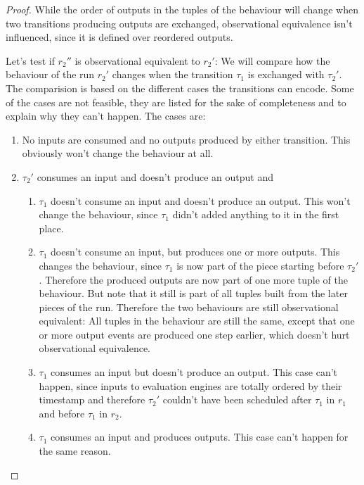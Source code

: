 \begin{proof}
    While the order of outputs in the tuples of the behaviour will change when two transitions producing outputs are exchanged, observational equivalence isn't influenced, since it is defined over reordered outputs.

    Let's test if \(r_2''\) is observational equivalent to \(r_2'\):
    We will compare how the behaviour of the run \(r_2'\) changes when the transition \(\tau_1\) is exchanged with \(\tau_2'\).
    The comparision is based on the different cases the transitions can encode.
    Some of the cases are not feasible, they are listed for the sake of completeness and to explain why they can't happen.
    The cases are:

    \begin{enumerate}
      \item No inputs are consumed and no outputs produced by either transition. This obviously won't change the behaviour at all.
      \item \(\tau_2'\) consumes an input and doesn't produce an output and
        \begin{enumerate}
          \item \(\tau_1\) doesn't consume an input and doesn't produce an output. This won't change the behaviour, since \(\tau_1\) didn't added anything to it in the first place.
          \item\label{sec:behaviours:without_timing:greedy:non_greedy_1} \(\tau_1\) doesn't consume an input, but produces one or more outputs. This changes the behaviour, since \(\tau_1\) is now part of the piece starting before \(\tau_2'\). Therefore the produced outputs are now part of one more tuple of the behaviour. But note that it still is part of all tuples built from the later pieces of the run. Therefore the two behaviours are still observational equivalent: All tuples in the behaviour are still the same, except that one or more output events are produced one step earlier, which doesn't hurt observational equivalence.
          \item\label{sec:behaviours:without_timing:greedy:impossible_case} \(\tau_1\) consumes an input but doesn't produce an output. This case can't happen, since inputs to evaluation engines are totally ordered by their timestamp and therefore \(\tau_2'\) couldn't have been scheduled after \(\tau_1\) in \(r_1\) and before \(\tau_1\) in \(r_2\).
          \item \(\tau_1\) consumes an input and produces outputs. This case can't happen for the same reason.
        \end{enumerate}

\end{enumerate}
\end{proof}
